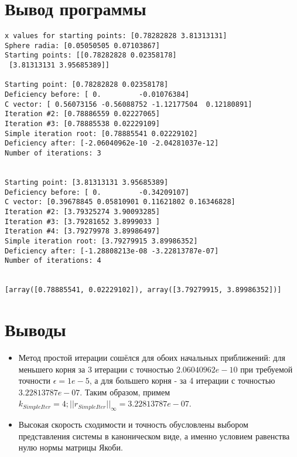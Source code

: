 \documentclass[14pt, a4paper]{article}
\begin{document}
  \section{Вывод программы}
\begin{verbatim}
x values for starting points: [0.78282828 3.81313131]
Sphere radia: [0.05050505 0.07103867]
Starting points: [[0.78282828 0.02358178]
 [3.81313131 3.95685389]]

Starting point: [0.78282828 0.02358178]
Deficiency before: [ 0.         -0.01076384]
C vector: [ 0.56073156 -0.56088752 -1.12177504  0.12180891]
Iteration #2: [0.78886559 0.02227065]
Iteration #3: [0.78885538 0.02229109]
Simple iteration root: [0.78885541 0.02229102]
Deficiency after: [-2.06040962e-10 -2.04281037e-12]
Number of iterations: 3


Starting point: [3.81313131 3.95685389]
Deficiency before: [ 0.         -0.34209107]
C vector: [0.39678845 0.05810901 0.11621802 0.16346828]
Iteration #2: [3.79325274 3.90093285]
Iteration #3: [3.79281652 3.8999033 ]
Iteration #4: [3.79279978 3.89986497]
Simple iteration root: [3.79279915 3.89986352]
Deficiency after: [-1.28808213e-08 -3.22813787e-07]
Number of iterations: 4


[array([0.78885541, 0.02229102]), array([3.79279915, 3.89986352])]
\end{verbatim}

  \section{Выводы}
  \begin{itemize}
  \item
  Метод простой итерации сошёлся для обоих начальных приближений: для меньшего корня за 3 итерации с точностью $2.06040962e-10$ при требуемой точности $\epsilon = 1e-5$, а для большего корня - за 4 итерации с точностью $3.22813787e-07$. Таким образом, примем $k_{SimpleIter} = 4; ||r_{SimpleIter}||_{\infty} = 3.22813787e-07$.
  \item
  Высокая скорость сходимости и точность обусловлены выбором представления системы в каноническом виде, а именно условием равенства нулю нормы матрицы Якоби.
  \end{itemize}
\end{document}
